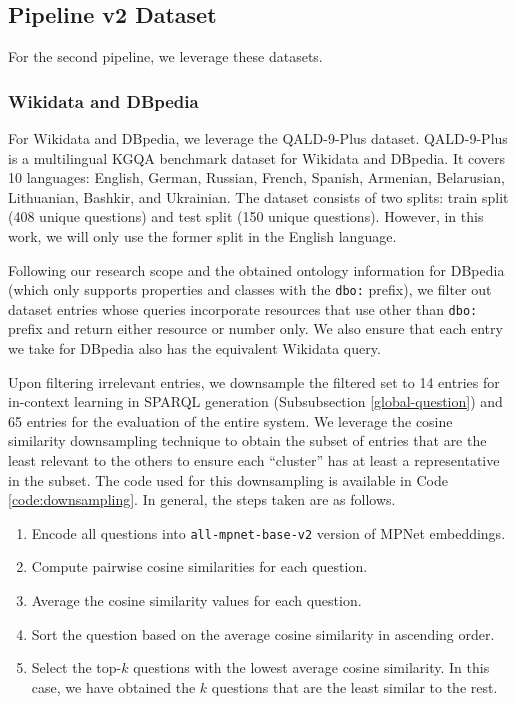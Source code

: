 \subsection{Pipeline v2 Dataset}
For the second pipeline, we leverage these datasets.
\subsubsection{Wikidata and DBpedia} \label{pipeline-v2-dataset-wikidata-dbpedia}
For Wikidata and DBpedia, we leverage the QALD-9-Plus \citep{perevalov2022qald9plus} dataset. QALD-9-Plus is a multilingual KGQA benchmark dataset for Wikidata and DBpedia. It covers 10 languages: English, German, Russian, French, Spanish, Armenian, Belarusian, Lithuanian, Bashkir, and Ukrainian. The dataset consists of two splits: train split (408 unique questions) and test split (150 unique questions). However, in this work, we will only use the former split in the English language.

Following our research scope and the obtained ontology information for DBpedia (which only supports properties and classes with the \texttt{dbo:} prefix), we filter out dataset entries whose queries incorporate resources that use other than \texttt{dbo:} prefix and return either resource or number only. We also ensure that each entry we take for DBpedia also has the equivalent Wikidata query.

Upon filtering irrelevant entries, we downsample the filtered set to 14 entries for in-context learning in SPARQL generation (Subsubsection \ref{global-question}) and 65 entries for the evaluation of the entire system. We leverage the cosine similarity downsampling technique to obtain the subset of entries that are the least relevant to the others to ensure each ``cluster'' has at least a representative in the subset. The code used for this downsampling is available in Code \ref{code:downsampling}. In general, the steps taken are as follows.

\begin{enumerate}
    \item Encode all questions into \texttt{all-mpnet-base-v2} version of MPNet embeddings.
    \item Compute pairwise cosine similarities for each question.
    \item Average the cosine similarity values for each question.
    \item Sort the question based on the average cosine similarity in ascending order.
    \item Select the top-$k$ questions with the lowest average cosine similarity. In this case, we have obtained the $k$ questions that are the least similar to the rest.
\end{enumerate}


